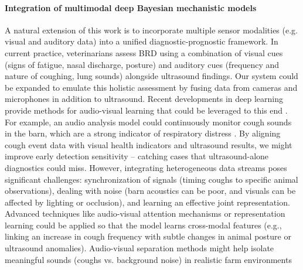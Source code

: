 \paragraph{Integration of multimodal deep Bayesian mechanistic models} A natural extension of this work is to incorporate multiple sensor modalities (e.g. visual and auditory data) into a unified diagnostic-prognostic framework. In current practice, veterinarians assess BRD using a combination of visual cues (signs of fatigue, nasal discharge, posture) and auditory cues (frequency and nature of coughing, lung sounds) alongside ultrasound findings. Our system could be expanded to emulate this holistic assessment by fusing data from cameras and microphones in addition to ultrasound. Recent developments in deep learning provide methods for audio-visual learning that could be leveraged to this end \cite{zhu2020deep}. For example, an audio analysis model could continuously monitor cough sounds in the barn, which are a strong indicator of respiratory distress \cite{10.1371/journal.pone.0123111}. By aligning cough event data with visual health indicators and ultrasound results, we might improve early detection sensitivity – catching cases that ultrasound-alone diagnostics could miss. However, integrating heterogeneous data streams poses significant challenges: synchronization of signals (timing coughs to specific animal observations), dealing with noise (barn acoustics can be poor, and visuals can be affected by lighting or occlusion), and learning an effective joint representation. Advanced techniques like audio-visual attention mechanisms or representation learning could be applied so that the model learns cross-modal features (e.g., linking an increase in cough frequency with subtle changes in animal posture or ultrasound anomalies). Audio-visual separation methods might help isolate meaningful sounds (coughs vs. background noise) in realistic farm environments 
